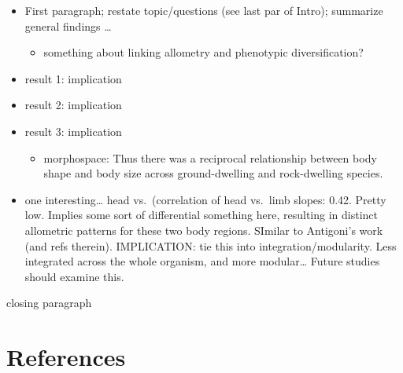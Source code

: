 \documentclass[
  11pt,
]{article}
\providecommand{\tightlist}{%
  \setlength{\itemsep}{0pt}\setlength{\parskip}{0pt}}
\begin{document}
\begin{itemize}
\item
  First paragraph; restate topic/questions (see last par of Intro);
  summarize general findings \ldots{}

  \begin{itemize}
  \tightlist
  \item
    something about linking allometry and phenotypic diversification?
  \end{itemize}
\item
  result 1: implication
\item
  result 2: implication
\item
  result 3: implication

  \begin{itemize}
  \tightlist
  \item
    morphospace: Thus there was a reciprocal relationship between body
    shape and body size across ground-dwelling and rock-dwelling
    species.
  \end{itemize}
\item
  one interesting\ldots{} head vs.~(correlation of head vs.~limb slopes:
  0.42. Pretty low. Implies some sort of differential something here,
  resulting in distinct allometric patterns for these two body regions.
  SImilar to Antigoni's work (and refs therein). IMPLICATION: tie this
  into integration/modularity. Less integrated across the whole
  organism, and more modular\ldots{} Future studies should examine this.
\end{itemize}

closing paragraph

\newpage

\hypertarget{references}{%
\section*{References}\label{references}}

\setlength{\parindent}{-0.25in} \setlength{\leftskip}{0.25in}
\setlength{\parskip}{8pt} \noindent
\end{document}
